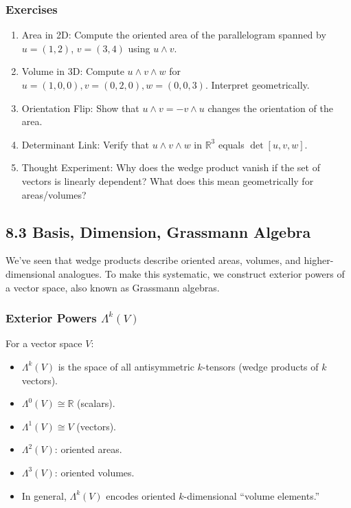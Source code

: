 \documentclass[
  letterpaper,
  DIV=11,
  numbers=noendperiod]{scrreprt}
\providecommand{\tightlist}{%
  \setlength{\itemsep}{0pt}\setlength{\parskip}{0pt}}
\begin{document}
\subsubsection{Exercises}\label{exercises-29}

\begin{enumerate}
\def\labelenumi{\arabic{enumi}.}
\item
  Area in 2D: Compute the oriented area of the parallelogram spanned by
  \(u=(1,2)\), \(v=(3,4)\) using \(u \wedge v\).
\item
  Volume in 3D: Compute \(u \wedge v \wedge w\) for
  \(u=(1,0,0), v=(0,2,0), w=(0,0,3)\). Interpret geometrically.
\item
  Orientation Flip: Show that \(u \wedge v = -v \wedge u\) changes the
  orientation of the area.
\item
  Determinant Link: Verify that \(u \wedge v \wedge w\) in
  \(\mathbb{R}^3\) equals \(\det[u,v,w]\).
\item
  Thought Experiment: Why does the wedge product vanish if the set of
  vectors is linearly dependent? What does this mean geometrically for
  areas/volumes?
\end{enumerate}

\subsection{8.3 Basis, Dimension, Grassmann
Algebra}\label{basis-dimension-grassmann-algebra}

We've seen that wedge products describe oriented areas, volumes, and
higher-dimensional analogues. To make this systematic, we construct
exterior powers of a vector space, also known as Grassmann algebras.

\subsubsection{\texorpdfstring{Exterior Powers
\(\Lambda^k(V)\)}{Exterior Powers \textbackslash Lambda\^{}k(V)}}\label{exterior-powers-lambdakv}

For a vector space \(V\):

\begin{itemize}
\tightlist
\item
  \(\Lambda^k(V)\) is the space of all antisymmetric \(k\)-tensors
  (wedge products of \(k\) vectors).
\item
  \(\Lambda^0(V) \cong \mathbb{R}\) (scalars).
\item
  \(\Lambda^1(V) \cong V\) (vectors).
\item
  \(\Lambda^2(V)\): oriented areas.
\item
  \(\Lambda^3(V)\): oriented volumes.
\item
  In general, \(\Lambda^k(V)\) encodes oriented \(k\)-dimensional
  ``volume elements.''
\end{itemize}
\end{document}
